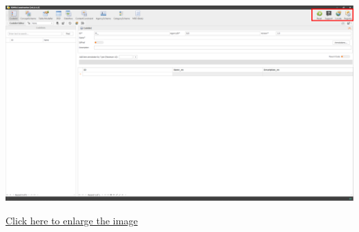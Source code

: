 \documentclass[
]{book}
\theoremstyle{definition}
\theoremstyle{definition}
\theoremstyle{definition}
\theoremstyle{definition}
\theoremstyle{remark}
\begin{document}
\begin{center}\includegraphics[width=1\linewidth]{./images/image011} \end{center}

\href{images/image011.png}{Click here to enlarge the image}
\end{document}
